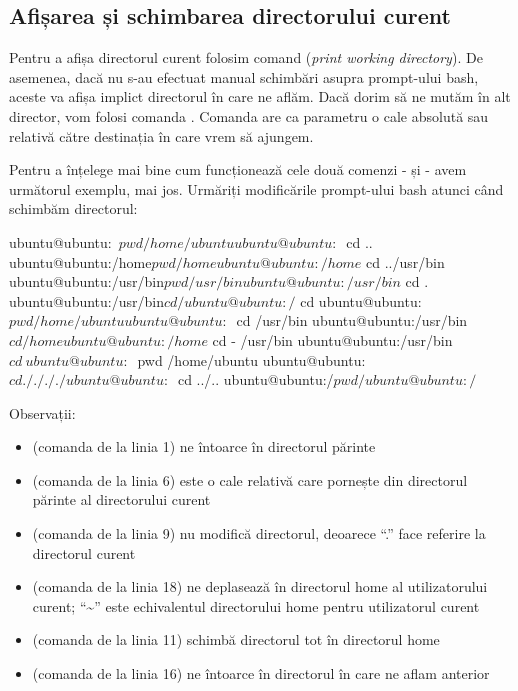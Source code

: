 \subsection{Afișarea și schimbarea directorului curent}

Pentru a afișa directorul curent folosim comand  (\textit{print working
directory}). De asemenea, dacă nu s-au efectuat manual schimbări asupra
prompt-ului bash, aceste va afișa implict directorul în care ne aflăm. Dacă
dorim să ne mutăm în alt director, vom folosi comanda . Comanda
 are ca parametru o cale absolută sau relativă către destinația în care
vrem să ajungem.

Pentru a înțelege mai bine cum funcționează cele două comenzi -  și
 - avem următorul exemplu, mai jos. Urmăriți modificările prompt-ului
bash atunci când schimbăm directorul:


\begin{screen}
ubuntu@ubuntu:~$ pwd
/home/ubuntu
ubuntu@ubuntu:~$ cd ..
ubuntu@ubuntu:/home$ pwd
/home
ubuntu@ubuntu:/home$ cd ../usr/bin
ubuntu@ubuntu:/usr/bin$ pwd
/usr/bin
ubuntu@ubuntu:/usr/bin$ cd .
ubuntu@ubuntu:/usr/bin$ cd /
ubuntu@ubuntu:/$ cd
ubuntu@ubuntu:~$ pwd
/home/ubuntu
ubuntu@ubuntu:~$ cd /usr/bin
ubuntu@ubuntu:/usr/bin$ cd /home
ubuntu@ubuntu:/home$ cd -
/usr/bin
ubuntu@ubuntu:/usr/bin$ cd ~
ubuntu@ubuntu:~$ pwd
/home/ubuntu
ubuntu@ubuntu:~$ cd ././././
ubuntu@ubuntu:~$ cd ../..
ubuntu@ubuntu:/$ pwd
/
ubuntu@ubuntu:/$
\end{screen}

Observații:
\begin{itemize}
	\item {} (comanda de la linia 1) ne întoarce în directorul
		părinte
	\item {} (comanda de la linia  6) este o cale
		relativă care pornește din directorul părinte al directorului
		curent
	\item {} (comanda de la linia  9) nu modifică directorul,
		deoarece “.” face referire la directorul curent
	\item {} (comanda de la linia  18) ne deplasează
		în directorul home al utilizatorului curent;  “\textasciitilde”
		este echivalentul directorului home pentru utilizatorul curent
	\item {} (comanda de la linia  11) schimbă directorul tot în
		directorul home
	\item {} (comanda de la linia  16) ne întoarce în directorul
		în care ne aflam anterior
\end{itemize}



